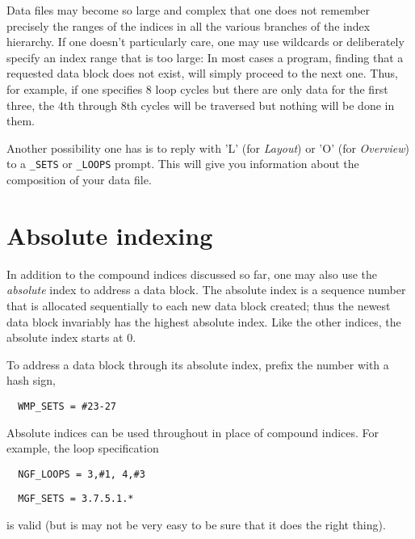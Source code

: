 	Data files may become so large and complex that one does not remember precisely the ranges of the indices in all the various branches of the index hierarchy. If one doesn't particularly care, one may use wildcards or deliberately specify an index range that is too large: In most cases a \NEWSTAR program, finding that a requested data block does not exist, will simply proceed to the next one. Thus, for example, if one specifies 8 loop cycles but there are only data for the first three, the 4th through 8th cycles will be traversed but nothing will be done in them.

	Another possibility one has is to reply with 'L' (for {\em Layout}) or 'O' (for {\em Overview}) to a \verb/_SETS/ or \verb/_LOOPS/ prompt. This will give you information about the composition of your data file.


\section{ Absolute indexing }

	In addition to the compound indices discussed so far, one may also use the {\em absolute} index to address a data block. The absolute index is a sequence number that is allocated sequentially to each new data block created; thus the newest data block invariably has the highest absolute index. Like the other indices, the absolute index starts at 0.

	To address a data block through its absolute index, prefix the number with a hash sign, \eg
\bi
\item[] \verb/  WMP_SETS = #23-27/
\ei

Absolute indices can be used throughout in place of compound indices. For example, the loop specification
\bi
\item[] \verb/  NGF_LOOPS = 3,#1, 4,#3/
\item[] \verb/  MGF_SETS = 3.7.5.1.*/
\ei

is valid (but is may not be very easy to be sure that it does the right thing).


